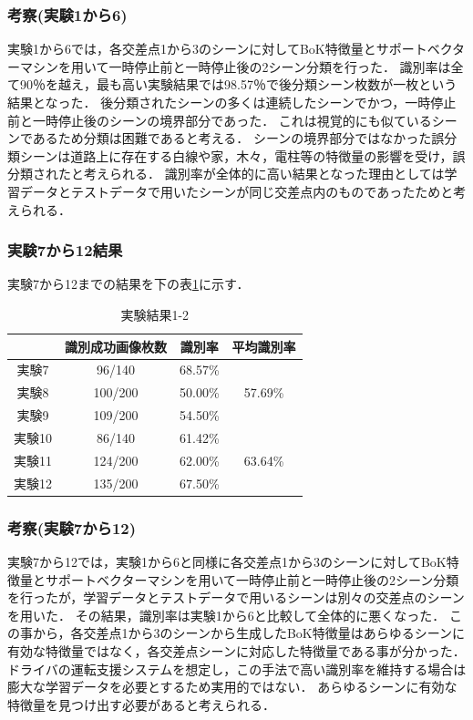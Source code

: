 \subsubsection*{考察(実験1から6)}
実験1から6では，各交差点1から3のシーンに対してBoK特徴量とサポートベクターマシンを用いて一時停止前と一時停止後の2シーン分類を行った．
識別率は全て90％を越え，最も高い実験結果では98.57％で後分類シーン枚数が一枚という結果となった．
後分類されたシーンの多くは連続したシーンでかつ，一時停止前と一時停止後のシーンの境界部分であった．
これは視覚的にも似ているシーンであるため分類は困難であると考える．
シーンの境界部分ではなかった誤分類シーンは道路上に存在する白線や家，木々，電柱等の特徴量の影響を受け，誤分類されたと考えられる．
識別率が全体的に高い結果となった理由としては学習データとテストデータで用いたシーンが同じ交差点内のものであったためと考えられる．\\

\newpage

\subsubsection{実験7から12結果}
実験7から12までの結果を下の表\ref{tb:result1-2}に示す．\\

\begin{table}[htbp]
  \begin{center}
    \caption{実験結果1-2}
    \begin{tabular}{|c||c|c|c|} \hline
      & 識別成功画像枚数 & 識別率 & 平均識別率 \\ \hline \hline
      実験7 & 96/140 & 68.57\% & \\ \cline{1-3}
      実験8 & 100/200 & 50.00\% & 57.69\% \\ \cline{1-3}
      実験9 & 109/200 & 54.50\% & \\ \hline
      実験10 & 86/140 & 61.42\% & \\ \cline{1-3}
      実験11 & 124/200 & 62.00\% & 63.64\% \\ \cline{1-3}
      実験12 & 135/200 & 67.50\% & \\ \hline
     \end{tabular}
   \label{tb:result1-2}
  \end{center}
\end{table}

\subsubsection*{考察(実験7から12)}
実験7から12では，実験1から6と同様に各交差点1から3のシーンに対してBoK特徴量とサポートベクターマシンを用いて一時停止前と一時停止後の2シーン分類を行ったが，学習データとテストデータで用いるシーンは別々の交差点のシーンを用いた．
その結果，識別率は実験1から6と比較して全体的に悪くなった．
この事から，各交差点1から3のシーンから生成したBoK特徴量はあらゆるシーンに有効な特徴量ではなく，各交差点シーンに対応した特徴量である事が分かった．
ドライバの運転支援システムを想定し，この手法で高い識別率を維持する場合は膨大な学習データを必要とするため実用的ではない．
あらゆるシーンに有効な特徴量を見つけ出す必要があると考えられる．


